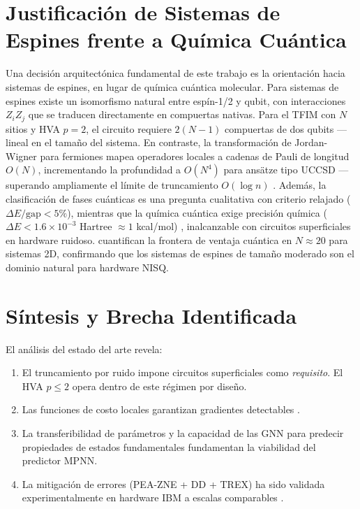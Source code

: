 \documentclass[11pt,a4paper,spanish]{book}
\begin{document}
\section{Justificación de Sistemas de Espines frente a Química Cuántica}

Una decisión arquitectónica fundamental de este trabajo es la orientación hacia sistemas de espines, en lugar de química cuántica molecular. Para sistemas de espines existe un isomorfismo natural entre espín-1/2 y qubit, con interacciones $Z_i Z_j$ que se traducen directamente en compuertas nativas. Para el TFIM con $N$ sitios y HVA $p = 2$, el circuito requiere $2(N-1)$ compuertas de dos qubits ---lineal en el tamaño del sistema. En contraste, la transformación de Jordan-Wigner para fermiones mapea operadores locales a cadenas de Pauli de longitud $O(N)$, incrementando la profundidad a $O(N^4)$ para ansätze tipo UCCSD \citep{tilly2022} ---superando ampliamente el límite de truncamiento $O(\log n)$ \citep{mele2026}. Además, la clasificación de fases cuánticas es una pregunta cualitativa con criterio relajado ($\Delta E/\text{gap} < 5\%$), mientras que la química cuántica exige precisión química ($\Delta E < 1.6 \times 10^{-3}$ Hartree $\approx 1$ kcal/mol) \citep{tilly2022}, inalcanzable con circuitos superficiales en hardware ruidoso. \citet{martin2026} cuantifican la frontera de ventaja cuántica en $N \approx 20$ para sistemas 2D, confirmando que los sistemas de espines de tamaño moderado son el dominio natural para hardware NISQ.

\section{Síntesis y Brecha Identificada}

El análisis del estado del arte revela:

\begin{enumerate}
    \item El truncamiento por ruido \citep{mele2026} impone circuitos superficiales como \emph{requisito}. El HVA $p \leq 2$ opera dentro de este régimen por diseño.
    \item Las funciones de costo locales garantizan gradientes detectables \citep{cerezo2021}.
    \item La transferibilidad de parámetros \citep{mele2022, puig2025} y la capacidad de las GNN para predecir propiedades de estados fundamentales \citep{huang2022, zhang2025} fundamentan la viabilidad del predictor MPNN.
    \item La mitigación de errores (PEA-ZNE + DD + TREX) ha sido validada experimentalmente en hardware IBM a escalas comparables \citep{kim2023, kiiamov2026, sharma2026}.
\end{enumerate}
\end{document}

